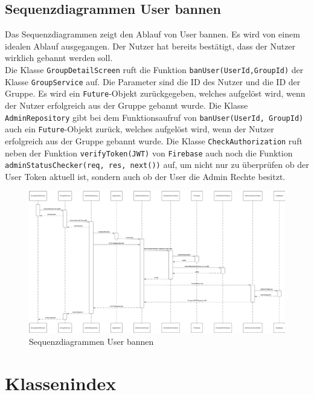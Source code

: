 \documentclass{entwurfsheft}
\begin{document}
    \newpage
    
    \subsection{Sequenzdiagrammen User bannen}
        Das Sequenzdiagrammen zeigt den Ablauf von User bannen. Es wird von einem idealen Ablauf ausgegangen. Der Nutzer hat bereits bestätigt, dass der Nutzer wirklich gebannt werden soll.\\
        Die Klasse \texttt{GroupDetailScreen} ruft die Funktion \texttt{banUser(UserId,GroupId)} der Klasse \texttt{GroupService} auf. Die Parameter sind die ID des Nutzer und die ID der Gruppe. Es wird ein \texttt{Future}-Objekt zurückgegeben, welches aufgelöst wird, wenn der Nutzer erfolgreich aus der Gruppe gebannt wurde. Die Klasse \texttt{AdminRepository} gibt bei dem Funktionsaufruf von \texttt{banUser(UserId, GroupId)} auch ein \texttt{Future}-Objekt zurück, welches aufgelöst wird, wenn der Nutzer erfolgreich aus der Gruppe gebannt wurde. Die Klasse \texttt{CheckAuthorization} ruft neben der Funktion \texttt{verifyToken(JWT)} von \texttt{Firebase} auch noch die Funktion \texttt{adminStatusChecker(req, res, next())} auf, um nicht nur zu überprüfen ob der User Token aktuell ist, sondern auch ob der User die Admin Rechte besitzt.

        \begin{figure}[htp]
            \centering
            \includegraphics[width = \linewidth]{images/processDescription/SequenzdiagrammBanUser.pdf}
            \caption{Sequenzdiagrammen User bannen}
        \end{figure}

    \newpage 

\newpage
\section{Klassenindex}
\end{document}
